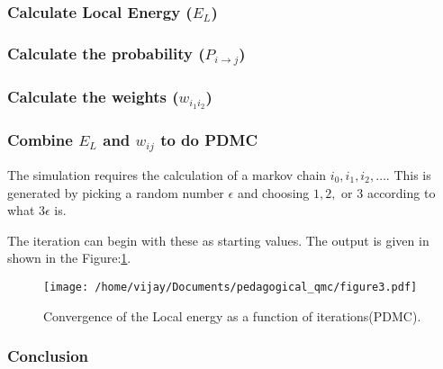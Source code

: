 \documentclass[11pt]{article}
\begin{document}
\subsubsection{Calculate Local Energy (\(E_L\))}
\label{sec:org3725c80}

\subsubsection{Calculate the probability (\(P_{i\rightarrow j}\))}
\label{sec:org47ad840}

\subsubsection{Calculate the weights (\(w_{i_1 i_2}\))}
\label{sec:org1db1b1d}

\subsubsection{Combine \(E_L\) and \(w_{ij}\) to do PDMC}
\label{sec:orgef9b379}
The simulation requires the calculation of a markov chain \(i_0, i_1, i_2,
\dots\). This is generated by picking a random number \(\epsilon\) and choosing
\(1, 2,\) or \(3\) according to what \(3 \epsilon\) is.

The iteration can begin with these as starting values. The output is given in
shown in the Figure:\ref{figure3}.

\begin{figure}[htbp]
\centering
\texttt{[image: /home/vijay/Documents/pedagogical\_qmc/figure3.pdf]}
\caption{\label{figure3}Convergence of the Local energy as a function of iterations(PDMC).}
\end{figure}

\subsubsection{Conclusion}
\label{sec:org01b952c}
\end{document}

